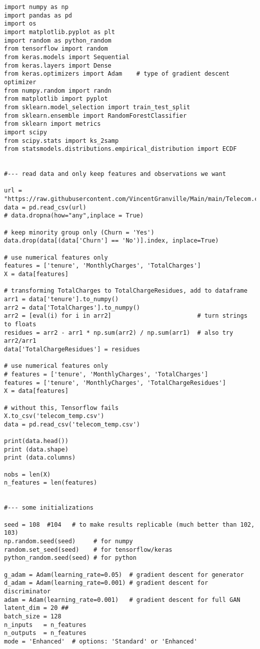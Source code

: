 \documentclass[oneside,10pt]{book}
\begin{document}
\begin{lstlisting}
import numpy as np
import pandas as pd
import os
import matplotlib.pyplot as plt
import random as python_random
from tensorflow import random
from keras.models import Sequential
from keras.layers import Dense
from keras.optimizers import Adam    # type of gradient descent optimizer
from numpy.random import randn
from matplotlib import pyplot
from sklearn.model_selection import train_test_split
from sklearn.ensemble import RandomForestClassifier
from sklearn import metrics
import scipy
from scipy.stats import ks_2samp
from statsmodels.distributions.empirical_distribution import ECDF


#--- read data and only keep features and observations we want

url = "https://raw.githubusercontent.com/VincentGranville/Main/main/Telecom.csv"
data = pd.read_csv(url)
# data.dropna(how="any",inplace = True) 

# keep minority group only (Churn = 'Yes')
data.drop(data[(data['Churn'] == 'No')].index, inplace=True)

# use numerical features only
features = ['tenure', 'MonthlyCharges', 'TotalCharges']    
X = data[features]

# transforming TotalCharges to TotalChargeResidues, add to dataframe
arr1 = data['tenure'].to_numpy()
arr2 = data['TotalCharges'].to_numpy() 
arr2 = [eval(i) for i in arr2]                        # turn strings to floats
residues = arr2 - arr1 * np.sum(arr2) / np.sum(arr1)  # also try arr2/arr1
data['TotalChargeResidues'] = residues

# use numerical features only
# features = ['tenure', 'MonthlyCharges', 'TotalCharges']    
features = ['tenure', 'MonthlyCharges', 'TotalChargeResidues']   
X = data[features]

# without this, Tensorflow fails
X.to_csv('telecom_temp.csv') 
data = pd.read_csv('telecom_temp.csv')

print(data.head())
print (data.shape)
print (data.columns)

nobs = len(X)
n_features = len(features)


#--- some initializations

seed = 108  #104   # to make results replicable (much better than 102, 103)
np.random.seed(seed)     # for numpy
random.set_seed(seed)    # for tensorflow/keras
python_random.seed(seed) # for python

g_adam = Adam(learning_rate=0.05)  # gradient descent for generator
d_adam = Adam(learning_rate=0.001) # gradient descent for discriminator 
adam = Adam(learning_rate=0.001)   # gradient descent for full GAN
latent_dim = 20 ## 
batch_size = 128
n_inputs   = n_features 
n_outputs  = n_features 
mode = 'Enhanced'  # options: 'Standard' or 'Enhanced'



\end{lstlisting}
\end{document}
